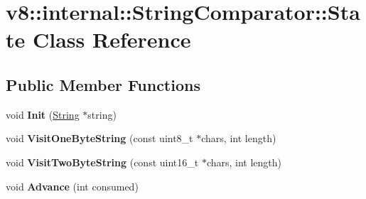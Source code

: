 \hypertarget{classv8_1_1internal_1_1_string_comparator_1_1_state}{}\section{v8\+:\+:internal\+:\+:String\+Comparator\+:\+:State Class Reference}
\label{classv8_1_1internal_1_1_string_comparator_1_1_state}
\subsection*{Public Member Functions}
\begin{DoxyCompactItemize}
\item 
void {\bfseries Init} (\hyperlink{classv8_1_1internal_1_1_string}{String} $\ast$string)\hypertarget{classv8_1_1internal_1_1_string_comparator_1_1_state_aff51925b2a70afb42ec6711e532b3dea}{}\label{classv8_1_1internal_1_1_string_comparator_1_1_state_aff51925b2a70afb42ec6711e532b3dea}

\item 
void {\bfseries Visit\+One\+Byte\+String} (const uint8\+\_\+t $\ast$chars, int length)\hypertarget{classv8_1_1internal_1_1_string_comparator_1_1_state_a1df64ee023e0306e314942dee8ecb77d}{}\label{classv8_1_1internal_1_1_string_comparator_1_1_state_a1df64ee023e0306e314942dee8ecb77d}

\item 
void {\bfseries Visit\+Two\+Byte\+String} (const uint16\+\_\+t $\ast$chars, int length)\hypertarget{classv8_1_1internal_1_1_string_comparator_1_1_state_aad91a7c9f04af53381cb2f7dbb65c47b}{}\label{classv8_1_1internal_1_1_string_comparator_1_1_state_aad91a7c9f04af53381cb2f7dbb65c47b}

\item 
void {\bfseries Advance} (int consumed)\hypertarget{classv8_1_1internal_1_1_string_comparator_1_1_state_aa74232608ec07ffd539254c3e4ca666f}{}\label{classv8_1_1internal_1_1_string_comparator_1_1_state_aa74232608ec07ffd539254c3e4ca666f}

\end{DoxyCompactItemize}
